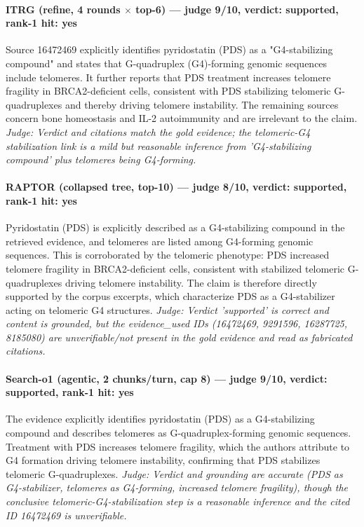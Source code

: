 \documentclass[sigconf, review, anonymous]{acmart}
\begin{document}
\paragraph{ITRG (refine, 4 rounds $\times$ top-6) --- judge 9/10, verdict: supported, rank-1 hit: yes}
\noindent Source 16472469 explicitly identifies pyridostatin (PDS) as a "G4-stabilizing compound" and states that G-quadruplex (G4)-forming genomic sequences include telomeres. It further reports that PDS treatment increases telomere fragility in BRCA2-deficient cells, consistent with PDS stabilizing telomeric G-quadruplexes and thereby driving telomere instability. The remaining sources concern bone homeostasis and IL-2 autoimmunity and are irrelevant to the claim.
\noindent\small\textit{Judge: Verdict and citations match the gold evidence; the telomeric-G4 stabilization link is a mild but reasonable inference from 'G4-stabilizing compound' plus telomeres being G4-forming.}
\paragraph{RAPTOR (collapsed tree, top-10) --- judge 8/10, verdict: supported, rank-1 hit: yes}
\noindent Pyridostatin (PDS) is explicitly described as a G4-stabilizing compound in the retrieved evidence, and telomeres are listed among G4-forming genomic sequences. This is corroborated by the telomeric phenotype: PDS increased telomere fragility in BRCA2-deficient cells, consistent with stabilized telomeric G-quadruplexes driving telomere instability. The claim is therefore directly supported by the corpus excerpts, which characterize PDS as a G4-stabilizer acting on telomeric G4 structures.
\noindent\small\textit{Judge: Verdict 'supported' is correct and content is grounded, but the evidence\_used IDs (16472469, 9291596, 16287725, 8185080) are unverifiable/not present in the gold evidence and read as fabricated citations.}
\paragraph{Search-o1 (agentic, 2 chunks/turn, cap 8) --- judge 9/10, verdict: supported, rank-1 hit: yes}
\noindent The evidence explicitly identifies pyridostatin (PDS) as a G4-stabilizing compound and describes telomeres as G-quadruplex-forming genomic sequences. Treatment with PDS increases telomere fragility, which the authors attribute to G4 formation driving telomere instability, confirming that PDS stabilizes telomeric G-quadruplexes.
\noindent\small\textit{Judge: Verdict and grounding are accurate (PDS as G4-stabilizer, telomeres as G4-forming, increased telomere fragility), though the conclusive telomeric-G4-stabilization step is a reasonable inference and the cited ID 16472469 is unverifiable.}
\end{document}

